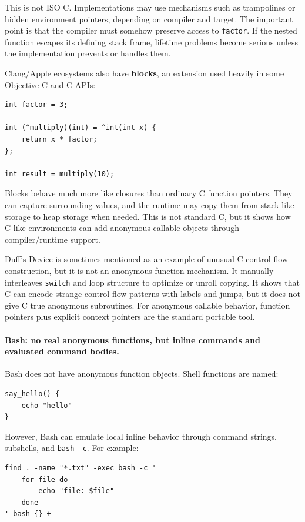 \documentclass[a4paper,twoside]{report}
\begin{document}
This is not ISO C. Implementations may use mechanisms such as trampolines or hidden environment pointers, depending on compiler and target. The important point is that the compiler must somehow preserve access to \texttt{factor}. If the nested function escapes its defining stack frame, lifetime problems become serious unless the implementation prevents or handles them.

Clang/Apple ecosystems also have \textbf{blocks}, an extension used heavily in some Objective-C and C APIs:

\begin{verbatim}
int factor = 3;

int (^multiply)(int) = ^int(int x) {
    return x * factor;
};

int result = multiply(10);
\end{verbatim}

Blocks behave much more like closures than ordinary C function pointers. They can capture surrounding values, and the runtime may copy them from stack-like storage to heap storage when needed. This is not standard C, but it shows how C-like environments can add anonymous callable objects through compiler/runtime support.

Duff's Device is sometimes mentioned as an example of unusual C control-flow construction, but it is not an anonymous function mechanism. It manually interleaves \texttt{switch} and loop structure to optimize or unroll copying. It shows that C can encode strange control-flow patterns with labels and jumps, but it does not give C true anonymous subroutines. For anonymous callable behavior, function pointers plus explicit context pointers are the standard portable tool.

\paragraph{Bash: no real anonymous functions, but inline commands and evaluated command bodies.}

Bash does not have anonymous function objects. Shell functions are named:

\begin{verbatim}
say_hello() {
    echo "hello"
}
\end{verbatim}

However, Bash can emulate local inline behavior through command strings, subshells, and \texttt{bash -c}. For example:

\begin{verbatim}
find . -name "*.txt" -exec bash -c '
    for file do
        echo "file: $file"
    done
' bash {} +
\end{verbatim}
\end{document}
